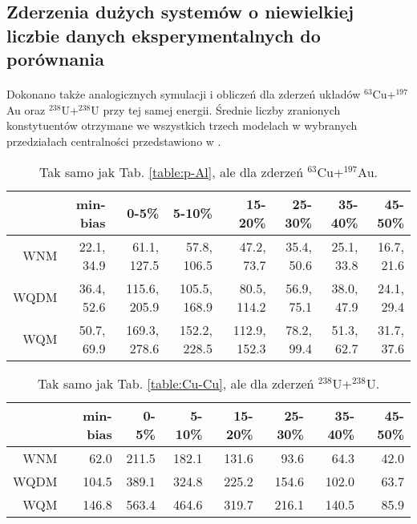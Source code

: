 \documentclass[a4paper,12pt]{article}
\begin{document}
\subsection{Zderzenia dużych systemów o niewielkiej liczbie danych eksperymentalnych do porównania}
\paragraph{}
Dokonano także analogicznych symulacji i obliczeń dla zderzeń układów $^{63}$Cu+$^{197}$Au oraz $^{238}$U+$^{238}$U przy tej samej energii. Średnie liczby zranionych konstytuentów otrzymane we wszystkich trzech modelach w wybranych przedziałach centralności przedstawiono w .

\begin{table}[H]\centering
\begin{tabular}{|r|r|r|r|r|r|r|r|} \hline
& min-bias & 0-5\% & 5-10\% & 15-20\% & 25-30\% & 35-40\% & 45-50\% \\ \hline
WNM  & 22.1, 34.9 & 61.1, 127.5 & 57.8, 106.5 & 47.2, 73.7 & 35.4, 50.6 & 25.1, 33.8 & 16.7, 21.6 \\ \hline
WQDM & 36.4, 52.6 & 115.6, 205.9 & 105.5, 168.9 & 80.5, 114.2 & 56.9, 75.1 & 38.0, 47.9 & 24.1, 29.4 \\ \hline
WQM  & 50.7, 69.9 & 169.3, 278.6 & 152.2, 228.5 & 112.9, 152.3 & 78.2, 99.4 & 51.3, 62.7 & 31.7, 37.6 \\ \hline
\end{tabular}
\caption{Tak samo jak Tab. \ref{table:p-Al}, ale dla zderzeń $^{63}$Cu+$^{197}$Au.}\label{table:Cu-Au}
\end{table}
\begin{table}[H]\centering
\begin{tabular}{|r|r|r|r|r|r|r|r|} \hline
& min-bias & 0-5\% & 5-10\% & 15-20\% & 25-30\% & 35-40\% & 45-50\% \\ \hline
WNM  & 62.0 & 211.5 & 182.1 & 131.6 & 93.6 & 64.3 & 42.0 \\ \hline
WQDM & 104.5 & 389.1 & 324.8 & 225.2 & 154.6 & 102.0 & 63.7 \\ \hline
WQM  & 146.8 & 563.4 & 464.6 & 319.7 & 216.1 & 140.5 & 85.9 \\ \hline
\end{tabular}
\caption{Tak samo jak Tab. \ref{table:Cu-Cu}, ale dla zderzeń $^{238}$U+$^{238}$U.}\label{table:U-U}

\end{table}
\end{document}
